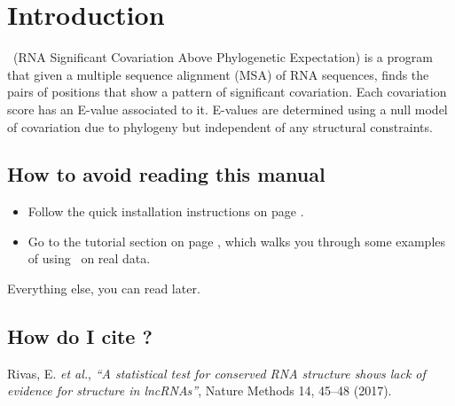 \section{Introduction}
\setcounter{footnote}{0}

\rscape\ (RNA Significant Covariation Above Phylogenetic Expectation)
is a program that given a multiple sequence alignment (MSA) of RNA
sequences, finds the pairs of positions that show a pattern of
significant covariation. Each covariation score has an E-value
associated to it. E-values are determined using a null model of
covariation due to phylogeny but independent of any structural
constraints. 

\subsection{How to avoid reading this manual}

\begin{itemize}
\item Follow the quick installation instructions on page
      \pageref{section:installation}. 
\item Go to the tutorial section on page
\pageref{section:tutorial}, which walks you through some examples of
using \rscape\ on real data.
\end{itemize}

Everything else, you can read later.



\subsection{How do I cite \rscape?}

Rivas, E. \textit{et al.}, \textit{``A statistical test for conserved
  RNA structure shows lack of evidence for structure in lncRNAs''},
Nature Methods 14, 45–48 (2017).













  









